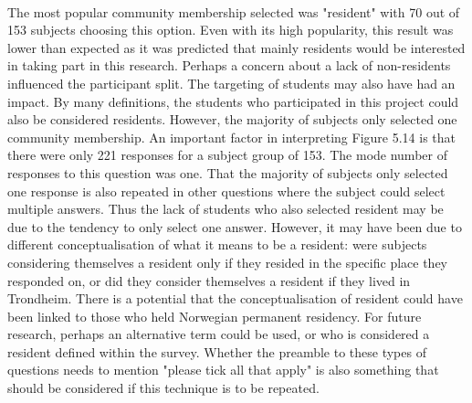 \paragraph{}
The most popular community membership selected was "resident" with 70 out of 153 subjects choosing this option. Even with its high popularity, this result was lower than expected as it was predicted that mainly residents would be interested in taking part in this research. Perhaps a concern about a lack of non-residents influenced the participant split. The targeting of students may also have had an impact. By many definitions, the students who participated in this project could also be considered residents. However, the majority of subjects only selected one community membership. An important factor in interpreting Figure 5.14 is that there were only 221 responses for a subject group of 153. The mode number of responses to this question was one. That the majority of subjects only selected one response is also repeated in other questions where the subject could select multiple answers. Thus the lack of students who also selected resident may be due to the tendency to only select one answer. However, it may have been due to different conceptualisation of what it means to be a resident: were subjects considering themselves a resident only if they resided in the specific place they responded on, or did they consider themselves a resident if they lived in Trondheim. There is a potential that the conceptualisation of resident could have been linked to those who held Norwegian permanent residency. For future research, perhaps an alternative term could be used, or who is considered a resident defined within the survey. Whether the preamble to these types of questions needs to mention "please tick all that apply" is also something that should be considered if this technique is to be repeated. 
\paragraph{}

